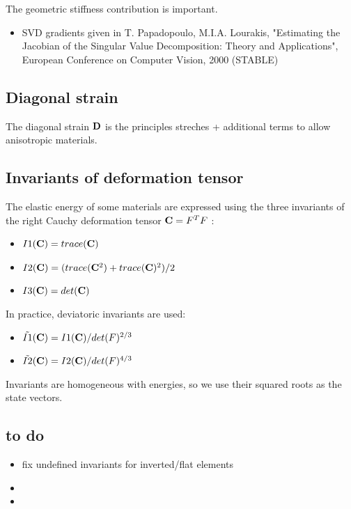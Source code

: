 The geometric stiffness contribution is important.
\begin{itemize}
\item SVD gradients given in T. Papadopoulo, M.I.A. Lourakis, "Estimating the Jacobian of the Singular Value Decomposition: Theory and Applications", European Conference on Computer Vision, 2000 (STABLE)
\end{itemize}

\subsection{Diagonal strain}

The diagonal strain $\mathbf{{D}}$ is the principles streches + additional terms to allow anisotropic materials. 


\subsection{Invariants of deformation tensor}

The elastic energy of some materials are expressed using the three invariants of the right Cauchy deformation tensor $\mathbf{{C}}=F^T F$ :

\begin{itemize}
 \item $I1(\mathbf{{C}}) = trace(\mathbf{{C}})$
 \item $I2(\mathbf{{C}}) = ( trace(\mathbf{{C}}^2)+trace(\mathbf{{C}})^2 )/2$
 \item $I3(\mathbf{{C}}) = det(\mathbf{{C}})$
\end{itemize}

In practice, deviatoric invariants are used:
\begin{itemize}
 \item $\tilde{I1}(\mathbf{{C}}) = I1(\mathbf{{C}})/det(F)^{2/3}$
 \item $\tilde{I2}(\mathbf{{C}}) = I2(\mathbf{{C}})/det(F)^{4/3}$
\end{itemize}

Invariants are homogeneous with energies, so we use their squared roots as the state vectors.

\subsection{to do}

\begin{itemize}
 \item fix undefined invariants for inverted/flat elements
 \item 
 \item 
\end{itemize}

